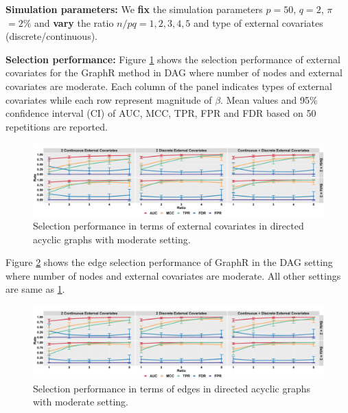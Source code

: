\documentclass[
]{book}
\begin{document}
\textbf{Simulation parameters:}
We \textbf{fix} the simulation parameters \(p = 50\), \(q = 2\), \(\pi\) \(= 2\%\) and \textbf{vary} the ratio \(n/pq = 1,2,3,4,5\) and type of external covariates (discrete/continuous).

\textbf{Selection performance:}
Figure \ref{fig:modext} shows the selection performance of external covariates for the GraphR method in DAG where number of nodes and external covariates are moderate. Each column of the panel indicates types of external covariates while each row represent magnitude of \(\beta\). Mean values and 95\% confidence interval (CI) of AUC, MCC, TPR, FPR and FDR based on 50 repetitions are reported.

\begin{figure}

{\centering \includegraphics[width=1\linewidth]{images/moderate_ext} 

}

\caption{Selection performance in terms of external covariates in directed acyclic graphs with moderate setting.}\label{fig:modext}
\end{figure}

Figure \ref{fig:modnode} shows the edge selection performance of GraphR in the DAG setting where number of nodes and external covariates are moderate. All other settings are same as \ref{fig:modext}.

\begin{figure}

{\centering \includegraphics[width=1\linewidth]{images/moderate_node} 

}

\caption{Selection performance in terms of edges in directed acyclic graphs with moderate setting.}\label{fig:modnode}
\end{figure}
\end{document}
